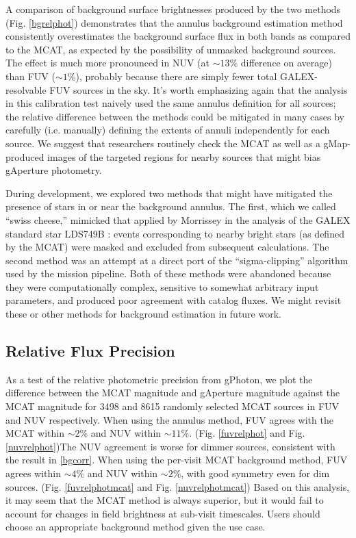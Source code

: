 \documentclass[preprint]{aastex}
\begin{document}
A comparison of background surface brightnesses produced by the two methods (Fig. \ref{bgrelphot}) demonstrates that the annulus background estimation method consistently overestimates the background surface flux in both bands as compared to the MCAT, as expected by the possibility of unmasked background sources. The effect is much more pronounced in NUV (at $\sim 13\%$ difference on average) than FUV ($\sim 1\%$), probably because there are simply fewer total GALEX-resolvable FUV sources in the sky. It's worth emphasizing again that the analysis in this calibration test naively used the same annulus definition for all sources; the relative difference between the methods could be mitigated in many cases by carefully (i.e. manually) defining the extents of annuli independently for each source. We suggest that researchers routinely check the MCAT as well as a gMap-produced images of the targeted regions for nearby sources that might bias gAperture photometry.

During development, we explored two methods that might have mitigated the presence of stars in or near the background annulus. The first, which we called ``swiss cheese,'' mimicked that applied by Morrissey in the analysis of the GALEX standard star LDS749B \citep{mor2007}: events corresponding to nearby bright stars (as defined by the MCAT) were masked and excluded from subsequent calculations. The second method was an attempt at a direct port of the ``sigma-clipping'' algorithm used by the mission pipeline. Both of these methods were abandoned because they were computationally complex, sensitive to somewhat arbitrary input parameters, and produced poor agreement with catalog fluxes. We might revisit these or other methods for background estimation in future work.

\subsection{Relative Flux Precision}
\label{relflux}
As a test of the relative photometric precision from gPhoton, we plot the difference between the MCAT magnitude and gAperture magnitude against the MCAT magnitude for 3498 and 8615 randomly selected MCAT sources in FUV and NUV respectively. When using the annulus method, FUV agrees with the MCAT within $\sim 2$\% and NUV within $\sim 11$\%. (Fig. \ref{fuvrelphot} and Fig. \ref{nuvrelphot})The NUV agreement is worse for dimmer sources, consistent with the result in \ref{bgcorr}. When using the per-visit MCAT background method, FUV agrees within $\sim 4$\% and NUV within $\sim 2$\%, with good symmetry even for dim sources. (Fig. \ref{fuvrelphotmcat} and Fig. \ref{nuvrelphotmcat}) Based on this analysis, it may seem that the MCAT method is always superior, but it would fail to account for changes in field brightness at sub-visit timescales. Users should choose an appropriate background method given the use case.
\end{document}
